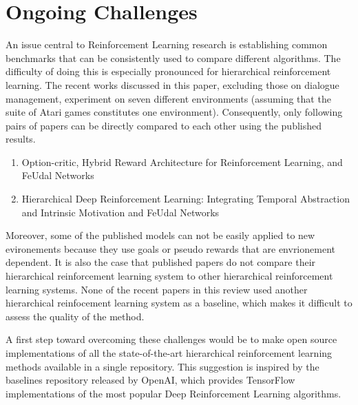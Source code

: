 \section{Ongoing Challenges}
An issue central to Reinforcement Learning research is establishing common benchmarks
that can be consistently used to compare different algorithms. The difficulty of
doing this is especially pronounced for hierarchical reinforcement learning.
The recent works discussed in this paper, excluding those on dialogue management,
experiment on seven different environments (assuming that the suite of Atari games
constitutes one environment). Consequently, only following pairs of papers
can be directly compared to each other using the published results.

\begin{enumerate}
    \item Option-critic, Hybrid Reward Architecture for Reinforcement Learning, and
          FeUdal Networks
    \item Hierarchical Deep Reinforcement Learning: Integrating Temporal Abstraction
          and Intrinsic Motivation and FeUdal Networks
\end{enumerate}

Moreover, some of the published models can not be easily applied to new evironements because
they use goals or pseudo rewards that are envrionement dependent. It is also the case
that published papers do not compare their hierarchical reinforcement learning system to
other hierarchical reinforcement learning systems. None of the recent papers in this review
used another hierarchical reinfocement learning system as a baseline, which makes it difficult
to assess the quality of the method.

A first step toward overcoming these challenges would be to make open source implementations
of all the state-of-the-art hierarchical reinforcement learning methods available in a single repository.
This suggestion is inspired by the baselines repository released by OpenAI, which provides TensorFlow
implementations of the most popular Deep Reinforcement Learning algorithms.


